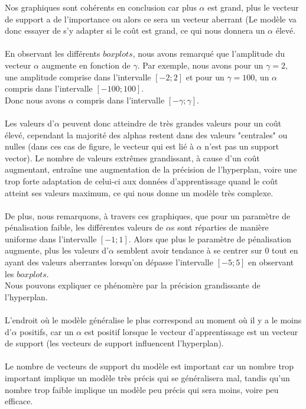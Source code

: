 \documentclass[a4paper, 10pt]{article}
\begin{document}
Nos graphiques sont cohérents en conclusion car plus $\alpha$ est grand, plus le vecteur de support a de l'importance ou alors ce sera un vecteur aberrant (Le modèle va donc essayer de s'y adapter si le coût est grand, ce qui nous donnera un $\alpha$ élevé.\\ \\
En observant les différents $boxplots$, nous avons remarqué que l'amplitude du vecteur $\alpha$ augmente en fonction de $\gamma$.
Par exemple, nous avons pour un $\gamma = 2$, une amplitude comprise dans l'intervalle $[-2;2]$ et pour un $\gamma = 100$, un $\alpha$ compris dans l'intervalle $[-100; 100]$.\\
Donc nous avons $\alpha$ compris dans l'intervalle $[-\gamma; \gamma]$.\\ \\
Les valeurs d'$\alpha$ peuvent donc atteindre de très grandes valeurs pour un coût élevé, cependant la majorité des alphas restent dans des valeurs "centrales" ou nulles (dans ces cas de figure, le vecteur qui est lié à $\alpha$ n'est pas un support vector).
Le nombre de valeurs extrêmes grandissant, à cause d'un coût augmentant, entraîne une augmentation de la précision de l'hyperplan, voire une trop forte adaptation de celui-ci aux données d'apprentissage quand le coût atteint ses valeurs maximum, ce qui nous donne un modèle très complexe.\\ \\
De plus, nous remarquons, à travers ces graphiques, que pour un paramètre de pénalisation faible, les différentes valeurs de $\alpha$s sont réparties de manière uniforme dans l'intervalle $[-1;1]$.
Alors que plus le paramètre de pénalisation augmente, plus les valeurs d'$\alpha$ semblent avoir tendance à se centrer sur 0 tout en ayant des valeurs aberrantes lorsqu'on dépasse l'intervalle $[-5;5]$ en observant les $boxplots$.\\
Nous pouvons expliquer ce phénomère par la précision grandissante de l'hyperplan.\\ \\
L'endroit où le modèle généralise le plus correspond au moment où il y a le moins d'$\alpha$ positifs, car un $\alpha$ est positif lorsque le vecteur d'apprentissage est un vecteur de support (les vecteurs de support influencent l'hyperplan).\\ \\
Le nombre de vecteurs de support du modèle est important car un nombre trop important implique un modèle très précis qui se généralisera mal, tandis qu’un nombre trop faible implique un modèle peu précis qui sera moins, voire peu efficace.
\end{document}
